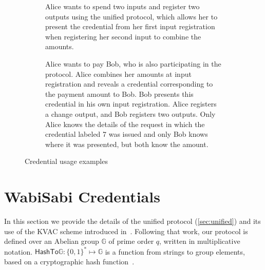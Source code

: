 \documentclass[a4paper]{article}
\begin{document}
\begin{figure}[h]
\begin{subfigure}{.45\linewidth}
  \caption{Alice wants to spend two inputs and register two outputs using the unified protocol, which allows her to present the credential from her first input registration when registering her second input to combine the amounts.}
  \label{fig:ex3}
  \end{subfigure}
\begin{subfigure}{.45\linewidth}
  \centering
  \caption{Alice wants to pay Bob, who is also participating in the protocol. Alice combines her amounts at input registration and reveals a credential corresponding to the payment amount to Bob. Bob presents this credential in his own input registration. Alice registers a change output, and Bob registers two outputs. Only Alice knows the details of the request in which the credential labeled 7 was issued and only Bob knows where it was presented, but both know the amount.}
  \label{fig:ex4}
  \end{subfigure}
  \caption{Credential usage examples}
\end{figure}

\section{WabiSabi Credentials}\label{sec:details}

In this section we provide the details of the unified protocol (\cref{sec:unified}) and its use of the KVAC scheme introduced in~\cite{chase2019signal}. Following that work, our protocol is defined over an Abelian group \(\mathbb{G}\) of prime order \(q\), written in multiplicative notation.
$\mathsf{HashTo\mathbb{G}} : \{0,1\}^{*} \mapsto \mathbb{G}$ is a function from strings to group elements, based on a cryptographic hash function~\cite{fouque2012indifferentiable}.
\end{document}
